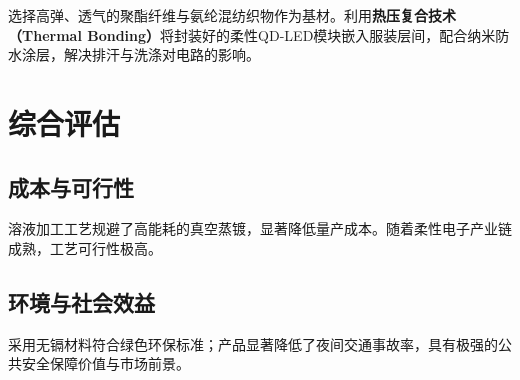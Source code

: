 \documentclass[12pt,a4paper]{ctexart}
\begin{document}
选择高弹、透气的聚酯纤维与氨纶混纺织物作为基材。利用\textbf{热压复合技术（Thermal Bonding）}将封装好的柔性QD-LED模块嵌入服装层间，配合纳米防水涂层，解决排汗与洗涤对电路的影响。

\section{综合评估}

\subsection{成本与可行性}

溶液加工工艺规避了高能耗的真空蒸镀，显著降低量产成本。随着柔性电子产业链成熟，工艺可行性极高。

\subsection{环境与社会效益}

采用无镉材料符合绿色环保标准；产品显著降低了夜间交通事故率，具有极强的公共安全保障价值与市场前景。
\end{document}

